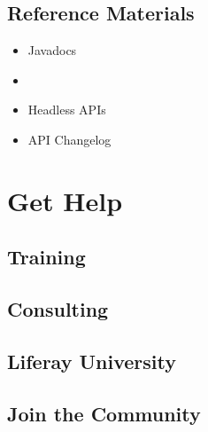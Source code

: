 \documentclass[letterpaper,10pt,english]{sphinxmanual}
\begin{document}
\section{Reference Materials}
\label{\detokenize{product/developer-guide/README:reference-materials}}\begin{itemize}
\item {} 
Javadocs

\item {} 

\item {} 
Headless APIs

\item {} 
API Changelog

\end{itemize}


\chapter{Get Help}
\label{\detokenize{product/get-help/README:get-help}}\label{\detokenize{product/get-help/README::doc}}

\section{Training}
\label{\detokenize{product/get-help/README:training}}

\section{Consulting}
\label{\detokenize{product/get-help/README:consulting}}

\section{Liferay University}
\label{\detokenize{product/get-help/README:liferay-university}}

\section{Join the Community}
\label{\detokenize{product/get-help/README:join-the-community}}
\end{document}
